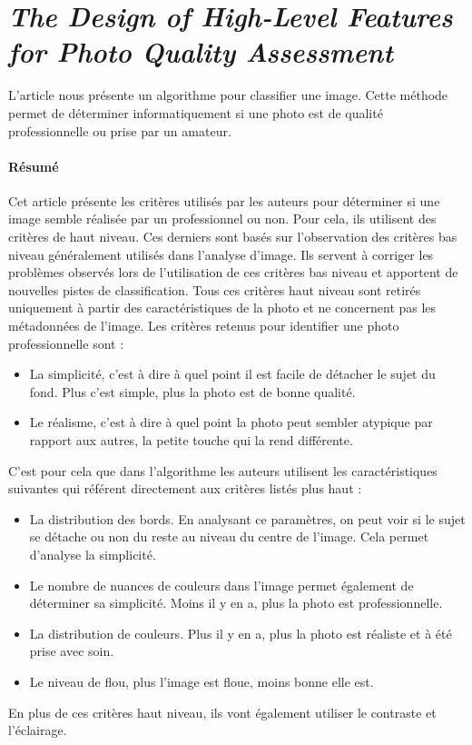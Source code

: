 \documentclass[11pt, french,screen]{report-rd-info}
\begin{document}
\section{\emph{The Design of High-Level Features for Photo Quality Assessment}}
L'article \cite{Ke} nous présente un algorithme pour classifier une image. Cette méthode permet de déterminer informatiquement si une photo est de qualité professionnelle ou prise par un amateur.
\paragraph{Résumé}
Cet article présente les critères utilisés par les auteurs pour déterminer si une image semble réalisée par un professionnel ou non. Pour cela, ils utilisent des critères de haut niveau. Ces derniers sont basés sur l'observation des critères bas niveau généralement utilisés dans l'analyse d'image. Ils servent à corriger les problèmes observés lors de l'utilisation de ces critères bas niveau et apportent de nouvelles pistes de classification.
Tous ces critères haut niveau sont retirés uniquement à partir des caractéristiques de la photo et ne concernent pas les métadonnées de l'image.
Les critères retenus pour identifier une photo professionnelle sont :
\begin{itemize}
\item La simplicité, c'est à dire à quel point il est facile de détacher le sujet du fond. Plus c'est simple, plus la photo est de bonne qualité.
\item Le réalisme, c'est à dire à quel point la photo peut sembler atypique par rapport aux autres, la petite touche qui la rend différente.
\end{itemize}
C'est pour cela que dans l'algorithme les auteurs utilisent les caractéristiques suivantes qui référent directement aux critères listés plus haut :
\begin{itemize}
\item La distribution des bords. En analysant ce paramètres, on peut voir si le sujet se détache ou non du reste au niveau du centre de l'image. Cela permet d'analyse la simplicité.
\item Le nombre de nuances de couleurs dans l'image permet également de déterminer sa simplicité. Moins il y en a, plus la photo est professionnelle.
\item La distribution de couleurs. Plus il y en a, plus la photo est réaliste et à été prise avec soin.
\item Le niveau de flou, plus l'image est floue, moins bonne elle est.
\end{itemize}
En plus de ces critères haut niveau, ils vont également utiliser le contraste et l'éclairage.
\end{document}
